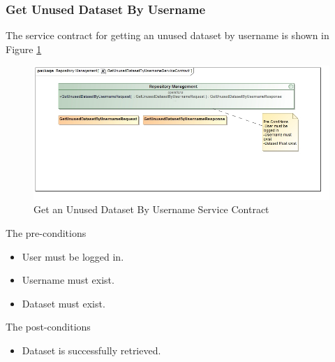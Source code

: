\subsubsection{Get Unused Dataset By Username}
The service contract for getting an unused dataset by username is shown in Figure \ref{fig:getUnusedDatasetByUsername}
\begin{figure}[H]
	\begin{center}
		\includegraphics[scale=0.6]{../Diagrams and Charts/Test Data/GetUnusedDatasetByUsernameServiceContract.jpg}
		\caption{Get an Unused Dataset By Username Service Contract}
		\label{fig:getUnusedDatasetByUsername}
	\end{center}
	
\end{figure}  

The pre-conditions
\begin{itemize}
	\item User must be logged in.
	\item Username must exist.
	\item Dataset must exist.
\end{itemize}

The post-conditions
\begin{itemize}
	\item Dataset is successfully retrieved.
\end{itemize}

